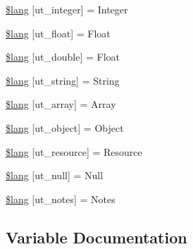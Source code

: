 \begin{DoxyCompactItemize}
\item 
\hyperlink{unit__test__lang_8php_aa59dea4a9af41fde66d69436eadfd67b}{\$lang} \mbox{[}\textquotesingle{}ut\+\_\+integer\textquotesingle{}\mbox{]} = \textquotesingle{}Integer\textquotesingle{}
\item 
\hyperlink{unit__test__lang_8php_a0f8267057369911f12753bdef18154cf}{\$lang} \mbox{[}\textquotesingle{}ut\+\_\+float\textquotesingle{}\mbox{]} = \textquotesingle{}Float\textquotesingle{}
\item 
\hyperlink{unit__test__lang_8php_a4c75bfa3ef771d6952b724b23d752b8e}{\$lang} \mbox{[}\textquotesingle{}ut\+\_\+double\textquotesingle{}\mbox{]} = \textquotesingle{}Float\textquotesingle{}
\item 
\hyperlink{unit__test__lang_8php_ab5097b676a29051de6c07955d59659d1}{\$lang} \mbox{[}\textquotesingle{}ut\+\_\+string\textquotesingle{}\mbox{]} = \textquotesingle{}String\textquotesingle{}
\item 
\hyperlink{unit__test__lang_8php_a3d6aa3d4ed503f15adc21813a9018950}{\$lang} \mbox{[}\textquotesingle{}ut\+\_\+array\textquotesingle{}\mbox{]} = \textquotesingle{}Array\textquotesingle{}
\item 
\hyperlink{unit__test__lang_8php_a771c29e5029c601b1f3e7c4e6fb93c94}{\$lang} \mbox{[}\textquotesingle{}ut\+\_\+object\textquotesingle{}\mbox{]} = \textquotesingle{}Object\textquotesingle{}
\item 
\hyperlink{unit__test__lang_8php_a6653a67c4fc0bc5ade6aaf327eed05bf}{\$lang} \mbox{[}\textquotesingle{}ut\+\_\+resource\textquotesingle{}\mbox{]} = \textquotesingle{}Resource\textquotesingle{}
\item 
\hyperlink{unit__test__lang_8php_ad4aef71cf1e43fa884add4613da590cb}{\$lang} \mbox{[}\textquotesingle{}ut\+\_\+null\textquotesingle{}\mbox{]} = \textquotesingle{}Null\textquotesingle{}
\item 
\hyperlink{unit__test__lang_8php_a4d80b77ed0c51d05d5abdc88afa1b540}{\$lang} \mbox{[}\textquotesingle{}ut\+\_\+notes\textquotesingle{}\mbox{]} = \textquotesingle{}Notes\textquotesingle{}
\end{DoxyCompactItemize}


\subsection{Variable Documentation}
\hypertarget{unit__test__lang_8php_ad25baa7cab208cbe1fbe6f6913b0e18c}{}
